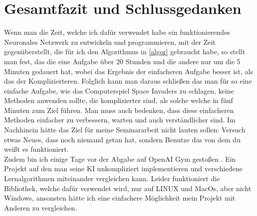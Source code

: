 \chapter{Gesamtfazit und Schlussgedanken}
Wenn man die Zeit, welche ich dafür verwendet habe ein funktionierendes Neuronales Netzwerk zu entwickeln und programmieren, mit der Zeit gegenüberstellt, die für ich den Algorithmus in \ref{algor} gebraucht habe, so stellt man fest, das die eine Aufgabe über 20 Stunden und die andere nur um die 5 Minuten gedauert hat, wobei das Ergebnis der einfacheren Aufgabe besser ist, als das der Komplizierteren. Folglich kann man daraus schließen das man für so eine einfache Aufgabe, wie das Computerspiel Space Invaders zu schlagen, keine Methoden anwenden sollte, die komplizierter sind, als solche welche in fünf Minuten zum Ziel führen. Man muss auch bedenken, dass diese einfacheren Methoden einfacher zu verbessern, warten und auch verständlicher sind. Im Nachhinein hätte das Ziel für meine Seminararbeit nicht lauten sollen: \glqq Versuch etwas Neues, dass noch niemand getan hat\grqq{}, sondern  \glqq Benutze das von dem du weißt es funktioniert\grqq{}.\\
Zudem bin ich einige Tage vor der Abgabe auf OpenAI Gym gestoßen \cite[vgl.][]{1606.01540}. Ein Projekt auf den man seine KI unkompliziert implementieren und verschiedene Lernalgorithmen miteinander vergleichen kann. Leider funktioniert die Bibliothek, welche dafür verwendet wird, nur auf LINUX und MacOs, aber nicht Windows, ansonsten hätte ich eine einfachere Möglichkeit mein Projekt mit  Anderen zu vergleichen.